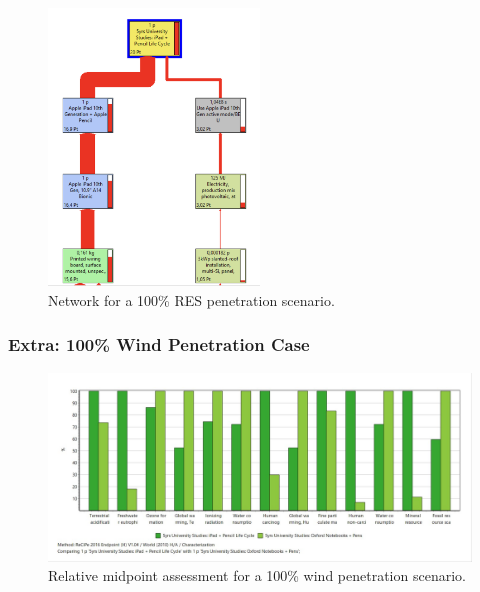 \begin{figure}[H]
    \centering
    \includegraphics[width=0.5\textwidth]{images/RES_100/100RES_network.png}
    \caption{Network for a 100\% RES penetration scenario.}\label{fig:100RES_network}
\end{figure}

\subsubsection{Extra: 100\% Wind Penetration Case}

\begin{figure}[H]
    \centering
    \includegraphics[width=\textwidth]{images/wind/Wind_midpoint_relative.JPG}
    \caption{Relative midpoint assessment for a 100\% wind penetration scenario.}\label{fig:characterization_wind_100}
\end{figure}

